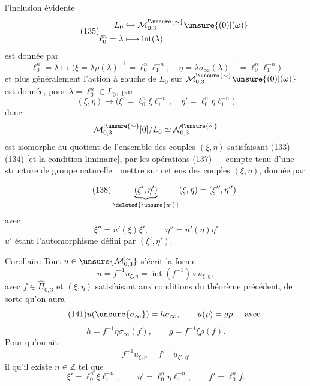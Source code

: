 
 l'inclusion évidente
\[
\tag{135}
\begin{aligned}
L_0&\hookrightarrow\mathcal M_{0,3}^{!\unsure{\sim}}\unsure{(0)|(\omega)}\\
\ell_0^n=\lambda&\longmapsto\operatorname{int}(\lambda)
\end{aligned}
\]
est donnée par
\[
\tag{136}
\ell_0^n=\lambda\longmapsto
\bigl(\xi=\lambda\rho(\lambda)^{-1}=\ell_0^n\ell_1^{-n},
\quad\eta=\lambda\sigma_\infty(\lambda)^{-1}=\ell_0^n\ell_1^{-n}\bigr)
\]
et plus généralement l'action à gauche de $L_0$ sur
$\mathcal M_{0,3}^{!\unsure{\sim}}\unsure{(0)|(\omega)}$ est donnée,
pour $\lambda=\ell_0^n\in L_0$, par
\[
\tag{137}
(\xi,\eta)\longmapsto
\bigl(\xi'=\ell_0^n\xi\ell_1^{-n},\quad
\eta'=\ell_0^n\eta\ell_1^{-n}\bigr)
\]
donc
\[
\mathcal M_{0,3}^{!\unsure{\sim}}[0]/L_0
\simeq\mathcal N_{0,3}^{!\unsure{\sim}}
\]
est isomorphe au quotient de l'ensemble des couples $(\xi,\eta)$
satisfaisant (133)(134) [et la condition liminaire], par les opérations
(137) --- compte tenu d'une 
structure de groupe naturelle : mettre sur cet ens des couples
$(\xi,\eta)$, donnée par


\[
\tag{138}
\underbrace{(\xi',\eta')}_{\deleted{\unsure{u'}}}(\xi,\eta)=(\xi'',\eta'')
\]
avec
\[
\tag{139}
\xi''=u'(\xi)\xi',\qquad \eta''=u'(\eta)\eta'
\]
$u'$ étant l'automorphisme défini par $(\xi',\eta')$.

\uline{Corollaire} Tout $u\in\unsure{\mathcal M_{0,3}^{!\sim}}$ s'écrit  la forme
\[
\tag{140}
u=f^{-1}u_{\xi,\eta}=\operatorname{int}(f^{-1})\circ u_{\xi,\eta},
\]
avec $f\in\widehat{\Pi}_{0,3}$ et $(\xi,\eta)$ satisfaisant aux conditions du théorème précédent, de sorte qu'on aura
\[
\tag{141}
u(\unsure{\sigma_\infty})=h\sigma_\infty,\qquad u(\rho)=g\rho,\quad\text{avec}
\]
\[
\tag{143}
h=f^{-1}\eta\sigma_\infty(f),\qquad g=f^{-1}\xi\rho(f).
\]
Pour qu'on ait
\[
f^{-1}u_{\xi,\eta}=f'^{-1}u_{\xi',\eta'}
\]
il  qu'il existe $n\in\mathbb Z$ tel que
\[
\tag{144}
\xi'=\ell_0^n\xi\ell_1^{-n},\qquad
\eta'=\ell_0^n\eta\ell_1^{-n},\qquad f'=\ell_0^n f.
\]

